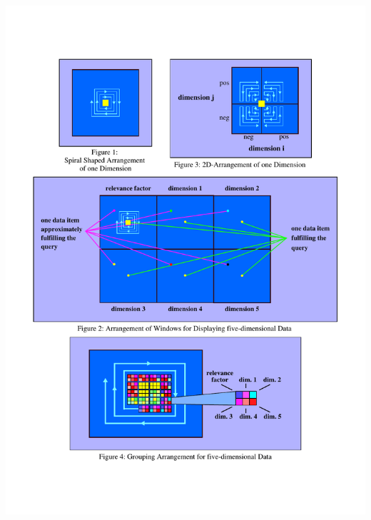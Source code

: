 \begin{itemize}
\hspace*{-1cm}\parbox [h]{0.33\textwidth }{
    \includegraphics [width=\linewidth]{figures/pixel_keim_spiral.pdf}
    \label{fig:pixel-spiral}
}
\hfill
\hspace{0.2cm}
\parbox [h]{0.3\textwidth }{
}
\end{itemize}

